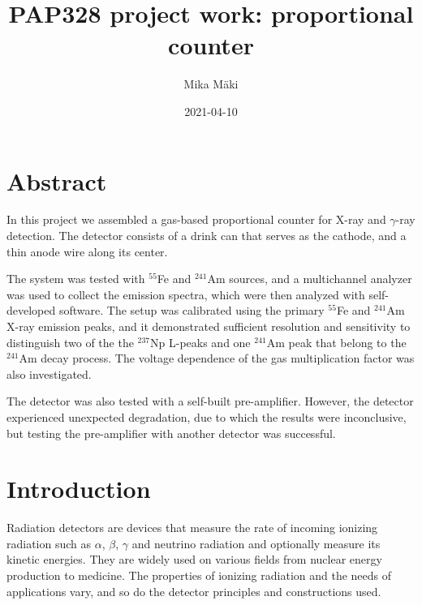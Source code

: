 \documentclass[a4paper]{article}
\title{PAP328 project work: proportional counter}
\author{Mika Mäki}
\date{2021-04-10}
\begin{document}
\maketitle

\section*{Abstract}
In this project we assembled a gas-based proportional counter for X-ray and $\gamma$-ray detection.
The detector consists of a drink can that serves as the cathode, and a thin anode wire along its center.


The system was tested with $^{55}$Fe and $^{241}$Am sources, and a multichannel analyzer was used to collect the emission spectra, which were then analyzed with self-developed software.
The setup was calibrated using the primary $^{55}$Fe and $^{241}$Am X-ray emission peaks, and it demonstrated sufficient resolution  and sensitivity to distinguish two of the the $^{237}$Np L-peaks and one $^{241}$Am peak that belong to the $^{241}$Am decay process.
The voltage dependence of the gas multiplication factor was also investigated.

The detector was also tested with a self-built pre-amplifier.
However, the detector experienced unexpected degradation, due to which the results were inconclusive, but testing the pre-amplifier with another detector was successful.

\tableofcontents


\section{Introduction}
\label{introduction}
Radiation detectors are devices that measure the rate of incoming ionizing radiation such as $\alpha$, $\beta$, $\gamma$ and neutrino radiation and optionally measure its kinetic energies.
They are widely used on various fields from nuclear energy production to medicine.
The properties of ionizing radiation and the needs of applications vary, and so do the detector principles and constructions used.
\end{document}
